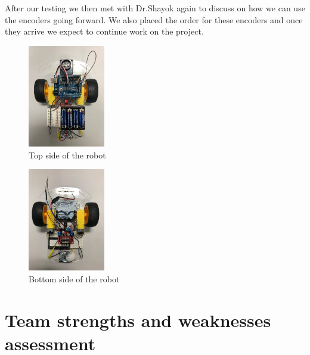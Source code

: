 \documentclass[a4paper, 12pt]{article}
\begin{document}
    After our testing we then met with Dr.Shayok again to discuss on how we can use the encoders going forward. We also placed the order for these encoders and once they arrive we expect to continue work on the project. 

    \begin{figure}
        \centering
        \captionsetup{justification=centering}
        \centering
            \includegraphics[width=0.3\textwidth]{robot_up.png}
            \caption{Top side of the robot}
    \end{figure}

    \begin{figure}
        \centering
        \captionsetup{justification=centering}
        \centering
            \includegraphics[width=0.3\textwidth]{robot_down.png}
            \caption{Bottom side of the robot}
    \end{figure}

    \section{Team strengths and weaknesses assessment}
\end{document}
